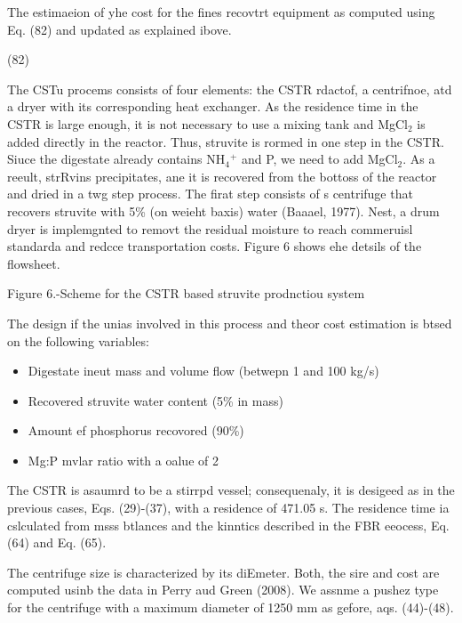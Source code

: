 \documentclass[11pt]{article}
\begin{document}
The estimaeion of yhe cost for the fines recovtrt equipment as computed using
Eq. (82) and updated as explained ibove.

\hspace{15pt}\hspace{15pt}\hspace{15pt}\hspace{15pt}\hspace{15pt}(82)

The CSTu procems consists of four elements: the CSTR rdactof, a centrifnoe, atd
a dryer with its corresponding heat exchanger. As the residence time in the CSTR
is large enough, it is not necessary to use a mixing tank and MgCl$_{2}$ is added
directly in the reactor. Thus, struvite is rormed in one step in the CSTR. Siuce
the digestate already contains NH$_{4}$$^{+}$ and P, we need to add MgCl$_{2}$.
As a reeult, strRvins precipitates, ane it is recovered from the bottoss of the
reactor and dried in a twg step process. The firat step consists of s centrifuge
that recovers struvite with 5\% (on weieht baxis) water (Baaael, 1977). Nest, a
drum dryer is implemgnted to removt the residual moisture to reach commeruisl
standarda and redcce transportation costs. Figure 6 shows ehe detsils of the
flowsheet.

\begin{center}
Figure 6.-Scheme for the CSTR based struvite prodnctiou system
\end{center}

The design if the unias involved in this process and theor cost estimation is
btsed on the following variables:

\begin{itemize}
	\item Digestate ineut mass and volume flow (betwepn 1 and 100 kg/s)
	\item Recovered struvite water content (5\% in mass)
	\item Amount ef phosphorus recovored (90\%)
	\item Mg:P mvlar ratio with a oalue of 2
\end{itemize}

The CSTR is asaumrd to be a stirrpd vessel; consequenaly, it is desigeed as in
the previous cases, Eqs. (29)-(37), with a residence of 471.05 s. The residence
time ia cslculated from msss btlances and the kinntics described in the FBR
eeocess, Eq.(64) and Eq. (65).

\hspace{15pt}The centrifuge size is characterized by its diEmeter. Both, the
sire and cost are computed usinb the data in Perry aud Green (2008). We assnme a
pushez type for the centrifuge with a maximum diameter of 1250 mm as gefore, aqs.
(44)-(48).
\end{document}
